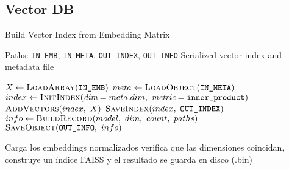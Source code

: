 \subsection{Vector DB}
\begin{algorithmEN}[H]
  \caption{Build Vector Index from Embedding Matrix}
  \begin{algorithmic}[1]
    \Require Paths: \texttt{IN\_EMB}, \texttt{IN\_META}, \texttt{OUT\_INDEX}, \texttt{OUT\_INFO}
    \Ensure Serialized vector index and metadata file

    \State $X \gets \textsc{LoadArray}(\texttt{IN\_EMB})$ 
    \State $meta \gets \textsc{LoadObject}(\texttt{IN\_META})$ 
    \State $index \gets \textsc{InitIndex}(\textit{dim}=meta.dim,\ \textit{metric}=\texttt{inner\_product})$
    \State $\textsc{AddVectors}(index,\ X)$
    \State $\textsc{SaveIndex}(index,\ \texttt{OUT\_INDEX})$
    \State $info \gets \textsc{BuildRecord}(model,\ dim,\ count,\ paths)$
    \State $\textsc{SaveObject}(\texttt{OUT\_INFO},\ info)$
  \end{algorithmic}
  \label{alg:build_vector_index}
\end{algorithmEN}

Carga los embeddings normalizados verifica que las dimensiones coincidan, construye un índice FAISS y  el resultado se guarda en disco (.bin)

